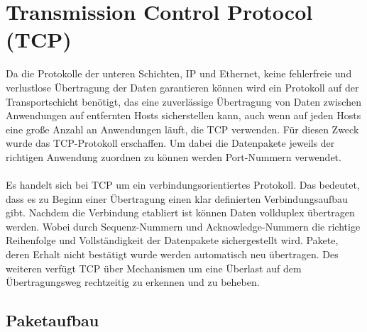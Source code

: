 \section{Transmission Control Protocol (TCP)}
Da die Protokolle der unteren Schichten, IP und Ethernet, keine fehlerfreie und verlustlose Übertragung der Daten garantieren können wird ein Protokoll auf der Transportschicht benötigt, das eine zuverlässige Übertragung von Daten zwischen Anwendungen auf entfernten Hosts sicherstellen kann, auch wenn auf jeden Hosts eine große Anzahl an Anwendungen läuft, die TCP verwenden. Für diesen Zweck wurde das TCP-Protokoll erschaffen. Um dabei die Datenpakete jeweils der richtigen Anwendung zuordnen zu können werden Port-Nummern verwendet. \\\\
Es handelt sich bei TCP um ein verbindungsorientiertes Protokoll. Das bedeutet, dass es zu Beginn einer Übertragung einen klar definierten Verbindungsaufbau gibt. Nachdem die Verbindung etabliert ist können Daten vollduplex übertragen werden. Wobei durch Sequenz-Nummern und Acknowledge-Nummern die richtige Reihenfolge und Vollständigkeit der Datenpakete sichergestellt wird. Pakete, deren Erhalt nicht bestätigt wurde werden automatisch neu übertragen. Des weiteren verfügt TCP über Mechanismen um eine Überlast auf dem Übertragungsweg rechtzeitig zu erkennen und zu beheben.  

\subsection{Paketaufbau}


